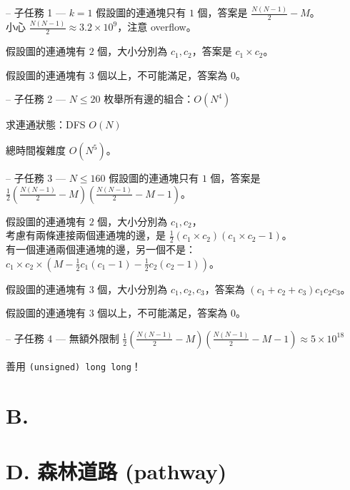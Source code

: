 \documentclass[hyperref,UTF8,notheorems,xcolor={dvipsnames}]{beamer}
\newcommand{\btitle}[1]{{\secname} -- #1}
\theoremstyle{definition}
\begin{document}
\begin{frame}[fragile]{\btitle{子任務 1 --- $k = 1$}}
	假設圖的連通塊只有 $1$ 個，答案是 $\frac{N(N-1)}{2} - M$。\\
	小心 $\frac{N(N-1)}{2} \approx 3.2 \times 10^9$，注意 overflow。
	
	假設圖的連通塊有 $2$ 個，大小分別為 $c_1, c_2$，答案是 $c_1 \times c_2$。

	假設圖的連通塊有 $3$ 個以上，不可能滿足，答案為 $0$。
\end{frame}

\begin{frame}[fragile]{\btitle{子任務 2 --- $N \leq 20$}}
	枚舉所有邊的組合：$O(N^4)$

	求連通狀態：DFS $O(N)$

	總時間複雜度 $O(N^5)$。  
\end{frame}

\begin{frame}[fragile]{\btitle{子任務 3 --- $N \leq 160$}}
	假設圖的連通塊只有 $1$ 個，答案是 $\frac{1}{2}\left(\frac{N(N-1)}{2} - M\right)\left(\frac{N(N-1)}{2} - M - 1\right)$。
	

	假設圖的連通塊有 $2$ 個，大小分別為 $c_1, c_2$，\\
	考慮有兩條連接兩個連通塊的邊，是 $\frac{1}{2}(c_1 \times c_2)(c_1 \times c_2 - 1)$。\\
	有一個連通兩個連通塊的邊，另一個不是：$c_1\times c_2 \times (M - \frac{1}{2}c_1(c_1-1) - \frac{1}{2}c_2(c_2-1))$。  


	假設圖的連通塊有 $3$ 個，大小分別為 $c_1, c_2, c_3$，答案為 $(c_1 + c_2 + c_3)c_1c_2c_3$。  
	

	假設圖的連通塊有 $3$ 個以上，不可能滿足，答案為 $0$。 
\end{frame}

\begin{frame}[fragile]{\btitle{子任務 4 --- 無額外限制}}
	$\frac{1}{2}\left(\frac{N(N-1)}{2} - M\right)\left(\frac{N(N-1)}{2} - M - 1\right) \approx 5 \times 10^{18}$  

	善用 \texttt{(unsigned) long long}！
\end{frame}

\section{B.}

\section{D. 森林道路 (pathway)}
\end{document}
